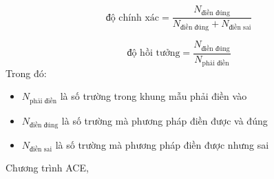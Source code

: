 \begin{equation}
  \label{eq:precision}
  \mbox{độ chính xác} = \frac{N_{\mbox{điền đúng}}}{N_{\mbox{điền đúng}} + N_{\mbox{điền sai}}}
\end{equation}


\begin{equation}
  \label{eq:recall}
  \mbox{độ hồi tưởng} = \frac{N_{\mbox{điền đúng}}}{N_{\mbox{phải điền}}}
\end{equation}
\noindent Trong đó:
\begin{itemize}
  \item $N_{\mbox{phải điền}}$ \hspace{0.5cm}là số trường trong khung mẫu phải điền vào
  \item $N_{\mbox{điền đúng}}$ \hspace{0.5cm} là số trường mà phương pháp điền được và  đúng
    \item $N_{\mbox{điền sai}}$ \hspace{0.5cm} là số trường mà phương pháp điền được nhưng sai
\end{itemize}

\noindent Chương trình ACE,






